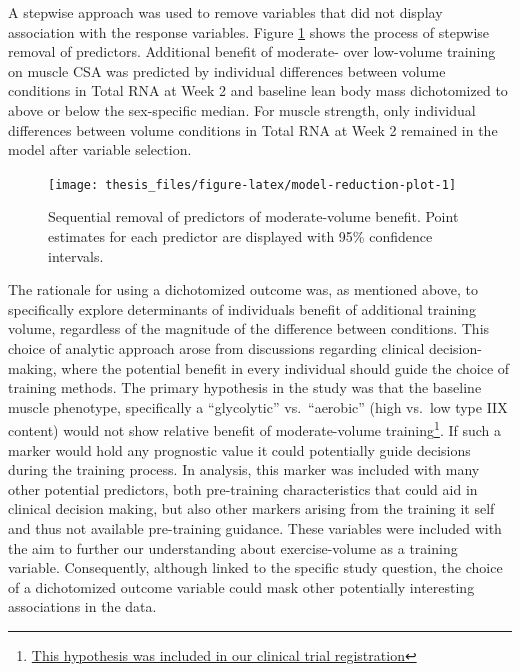 \documentclass[twoside,10pt]{gihclass} %
\begin{document}
A stepwise approach was used to remove variables that did not display association with the response variables. Figure \ref{fig:model-reduction-plot} shows the process of stepwise removal of predictors.
Additional benefit of moderate- over low-volume training on muscle CSA was predicted by individual differences between volume conditions in Total RNA at Week 2 and baseline lean body mass dichotomized to above or below the sex-specific median.
For muscle strength, only individual differences between volume conditions in Total RNA at Week 2 remained in the model after variable selection.
\begin{figure}

{\centering \texttt{[image: thesis\_files/figure-latex/model-reduction-plot-1]} 

}

\caption[Step-wise variable selection of determinants of moderate- over low-volume training benefit.]{Sequential removal of predictors of moderate-volume benefit. Point estimates for each predictor are displayed with 95\% confidence intervals.}\label{fig:model-reduction-plot}
\end{figure}
The rationale for using a dichotomized outcome was, as mentioned above, to specifically explore determinants of individuals benefit of additional training volume, regardless of the magnitude of the difference between conditions.
This choice of analytic approach arose from discussions regarding clinical decision-making, where the potential benefit in every individual should guide the choice of training methods. The primary hypothesis in the study was that the baseline muscle phenotype, specifically a ``glycolytic'' vs.~``aerobic'' (high vs.~low type IIX content) would not show relative benefit of moderate-volume training\footnote{\href{https://clinicaltrials.gov/ct2/show/NCT02179307?term=lillehammer\&draw=2\&rank=9}{This hypothesis was included in our clinical trial registration}}. If such a marker would hold any prognostic value it could potentially guide decisions during the training process. In analysis, this marker was included with many other potential predictors, both pre-training characteristics that could aid in clinical decision making, but also other markers arising from the training it self and thus not available pre-training guidance. These variables were included with the aim to further our understanding about exercise-volume as a training variable.
Consequently, although linked to the specific study question, the choice of a dichotomized outcome variable could mask other potentially interesting associations in the data.
\end{document}
